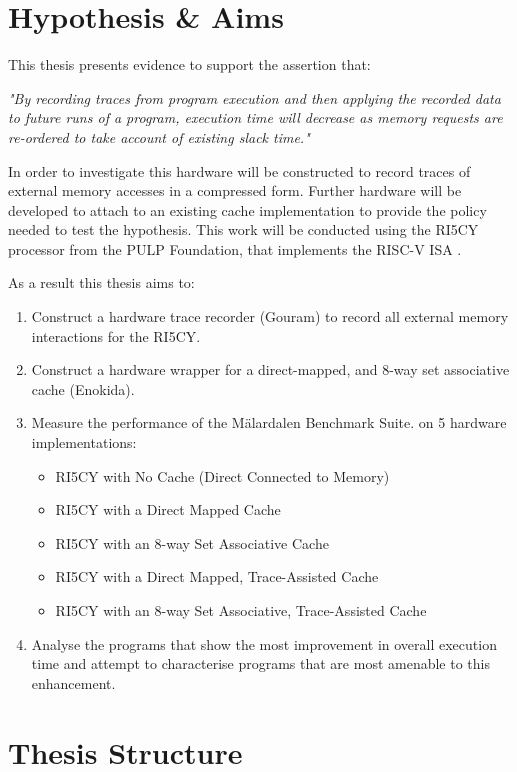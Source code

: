 \section{Hypothesis \& Aims}

This thesis presents evidence to support the assertion that:

\emph{"By recording traces from program execution and then applying the recorded data to future runs of a program, execution time will decrease as memory requests are re-ordered to take account of existing slack time."}

In order to investigate this hardware will be constructed to record traces of external memory accesses in a compressed form. Further hardware will be developed to attach to an existing cache implementation to provide the policy needed to test the hypothesis. This work will be conducted using the RI5CY processor \cite{gautschiNearThresholdRISCVCore2017} from the PULP Foundation, that implements the RISC-V ISA \cite{watermanRISCVInstructionSet2019}.

As a result this thesis aims to:

\begin{enumerate}
	\item Construct a hardware trace recorder (Gouram) to record all external memory interactions for the RI5CY.
	\item Construct a hardware wrapper for a direct-mapped, and 8-way set associative cache (Enokida). 
	\item Measure the performance of the Mälardalen Benchmark Suite. \cite{gustafssonMalardalenWCETBenchmarks2010} on 5 hardware implementations:
	\begin{itemize}
		\item RI5CY with No Cache (Direct Connected to Memory)
		\item RI5CY with a Direct Mapped Cache
		\item RI5CY with an 8-way Set Associative Cache
		\item RI5CY with a Direct Mapped, Trace-Assisted Cache
		\item RI5CY with an 8-way Set Associative, Trace-Assisted Cache
	\end{itemize}
	\item Analyse the programs that show the most improvement in overall execution time and attempt to characterise programs that are most amenable to this enhancement.
\end{enumerate}

\section{Thesis Structure}

